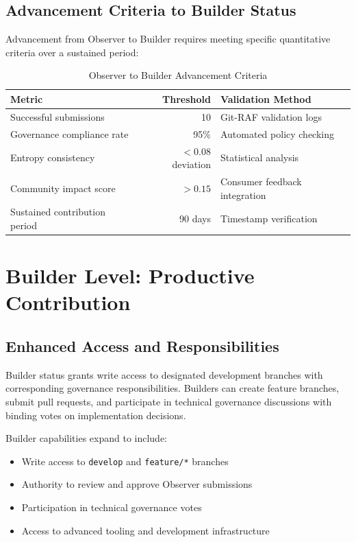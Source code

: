 \subsection{Advancement Criteria to Builder Status}

Advancement from Observer to Builder requires meeting specific quantitative criteria over a sustained period:

\begin{table}[h]
\centering
\begin{tabular}{|l|r|l|}
\hline
\textbf{Metric} & \textbf{Threshold} & \textbf{Validation Method} \\
\hline
Successful submissions & 10 & Git-RAF validation logs \\
Governance compliance rate & 95\% & Automated policy checking \\
Entropy consistency & $< 0.08$ deviation & Statistical analysis \\
Community impact score & $> 0.15$ & Consumer feedback integration \\
Sustained contribution period & 90 days & Timestamp verification \\
\hline
\end{tabular}
\caption{Observer to Builder Advancement Criteria}
\label{tab:observer_advancement}
\end{table}

\section{Builder Level: Productive Contribution}

\subsection{Enhanced Access and Responsibilities}

Builder status grants write access to designated development branches with corresponding governance responsibilities. Builders can create feature branches, submit pull requests, and participate in technical governance discussions with binding votes on implementation decisions.

Builder capabilities expand to include:
\begin{itemize}
\item Write access to \texttt{develop} and \texttt{feature/*} branches
\item Authority to review and approve Observer submissions
\item Participation in technical governance votes
\item Access to advanced tooling and development infrastructure
\end{itemize}

